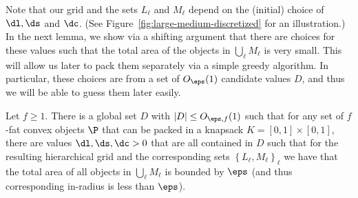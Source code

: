 Note that our grid and the sets $L_{\ell}$ and $M_{\ell}$ depend
on the (initial) choice of $\dl, \ds$ and $\dc$. (See Figure~\ref{fig:large-medium-discretized} for an illustration.) In the next lemma, we show via
a shifting argument that there are choices for these values such that the
total area of the objects in $\bigcup_{\ell}M_{\ell}$ is very small.
This will allow us later to pack them separately via a simple greedy
algorithm. In particular, these choices are from a set of $O_\eps(1)$ candidate values $D$, and thus
we will be able to guess them later easily.


\begin{lemma}\label{lem:medium-items}Let $f\ge 1$. There is a global set $D$ with $|D|\le O_{\eps,f}(1)$
such that for any set of $f$-fat convex objects $\P$ that can be packed
in a knapsack $K=[0,1]\times[0,1]$, there are values $\dl,\ds,\dc>0$
that are all contained in $D$
such that for the resulting hierarchical grid and the corresponding
sets $\left\{ L_{\ell},M_{\ell}\right\} _{\ell}$ we have that the
total area of all objects in $\bigcup_{\ell}M_{\ell}$ is bounded
by $\eps$ (and thus corresponding in-radius is less than $\eps$).
\end{lemma}

